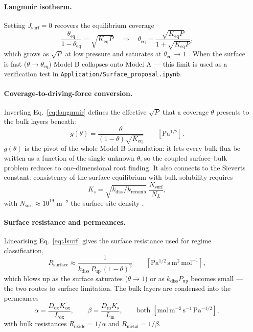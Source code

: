 \documentclass[11pt,a4paper]{article}
\newcommand{\Pup}{P_{\mathrm{up}}}
\newcommand{\Ks}{K_{\mathrm{s}}}
\newcommand{\Kox}{K_{\mathrm{ox}}}
\newcommand{\Keq}{K_{\mathrm{eq}}}
\newcommand{\Dm}{D_{\mathrm{m}}}
\newcommand{\Dox}{D_{\mathrm{ox}}}
\newcommand{\Lm}{L_{\mathrm{m}}}
\newcommand{\Lox}{L_{\mathrm{ox}}}
\newcommand{\kdiss}{k_{\mathrm{diss}}}
\newcommand{\krec}{k_{\mathrm{recomb}}}
\newcommand{\Rsurf}{R_{\mathrm{surface}}}
\newcommand{\Rox}{R_{\mathrm{oxide}}}
\newcommand{\Rmet}{R_{\mathrm{metal}}}
\newcommand{\code}[1]{\texttt{#1}}
\begin{document}
\paragraph{Langmuir isotherm.} Setting $J_{\mathrm{surf}} = 0$ recovers the
equilibrium coverage
\begin{equation}
  \frac{\theta_{\mathrm{eq}}}{1-\theta_{\mathrm{eq}}} = \sqrt{\Keq P}
  \quad\Longrightarrow\quad
  \theta_{\mathrm{eq}} = \frac{\sqrt{\Keq P}}{1 + \sqrt{\Keq P}},
  \label{eq:langmuir}
\end{equation}
which grows as $\sqrt{P}$ at low pressure and saturates at
$\theta_{\mathrm{eq}} \to 1$ \citep{langmuir1918}. When the surface is fast
($\theta \to \theta_{\mathrm{eq}}$) Model B collapses onto Model A --- this
limit is used as a verification test in
\code{Application/Surface\_proposal.ipynb}.

\paragraph{Coverage-to-driving-force conversion.} Inverting
Eq.~\eqref{eq:langmuir} defines the effective $\sqrt{P}$ that a coverage
$\theta$ presents to the bulk layers beneath:
\begin{equation}
  g(\theta) = \frac{\theta}{(1-\theta)\sqrt{\Keq}} \qquad [\mathrm{Pa^{1/2}}].
  \label{eq:gtheta}
\end{equation}
$g(\theta)$ is the pivot of the whole Model B formulation: it lets every bulk
flux be written as a function of the single unknown $\theta$, so the coupled
surface--bulk problem reduces to one-dimensional root finding. It also
connects to the Sieverts constant: consistency of the surface equilibrium
with bulk solubility requires
\begin{equation}
  \Ks = \sqrt{\kdiss/\krec}\;\frac{N_{\mathrm{surf}}}{N_L},
  \label{eq:KsKeq}
\end{equation}
with $N_{\mathrm{surf}} \approx 10^{19}\;\mathrm{m^{-2}}$ the surface site
density \citep{pick1985}.

\paragraph{Surface resistance and permeances.} Linearising
Eq.~\eqref{eq:Jsurf} gives the surface resistance used for regime
classification,
\begin{equation}
  \Rsurf \approx \frac{1}{\kdiss\,\Pup\,(1-\theta)^2}
  \qquad [\mathrm{Pa^{1/2}\,s\,m^{2}\,mol^{-1}}],
  \label{eq:Rsurface}
\end{equation}
which blows up as the surface saturates ($\theta \to 1$) or as $\kdiss\Pup$
becomes small --- the two routes to surface limitation. The bulk layers are
condensed into the permeances
\begin{equation}
  \alpha = \frac{\Dox\Kox}{\Lox},
  \qquad
  \beta = \frac{\Dm\Ks}{\Lm},
  \qquad
  \text{both } [\mathrm{mol\,m^{-2}\,s^{-1}\,Pa^{-1/2}}],
  \label{eq:permeances}
\end{equation}
with bulk resistances $\Rox = 1/\alpha$ and $\Rmet = 1/\beta$.
\end{document}
